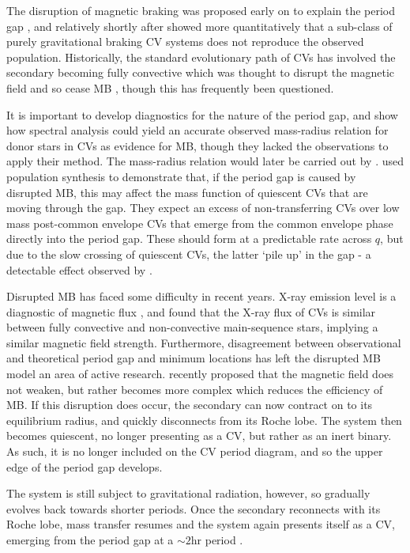 The disruption of magnetic braking was proposed early on to explain the period gap \citep{rappaport1983, spruit1983}, and relatively shortly after \citet{kolb1993} showed more quantitatively that a sub-class of purely gravitational braking CV systems does not reproduce the observed population. Historically, the standard evolutionary path of CVs has involved the secondary becoming fully convective which was thought to disrupt the magnetic field and so cease MB \citep{knigge11}, though this has frequently been questioned. 

It is important to develop diagnostics for the nature of the period gap, and \citet{smith1998} show how spectral analysis could yield an accurate observed mass-radius relation for donor stars in CVs as evidence for MB, though they lacked the observations to apply their method. The mass-radius relation would later be carried out by \citet{knigge11}.
\citet{Davis2008} used population synthesis to demonstrate that, if the period gap is caused by disrupted MB, this may affect the mass function of quiescent CVs that are moving through the gap. They expect an excess of non-transferring CVs over low mass post-common envelope CVs that emerge from the common envelope phase directly into the period gap. These should form at a predictable rate across $q$, but due to the slow crossing of quiescent CVs, the latter `pile up' in the gap - a detectable effect observed by \citet{zorotovic2011}.

Disrupted MB has faced some difficulty in recent years. X-ray emission level is a diagnostic of magnetic flux \citep{pevtsov2003}, and \citet{wright2016} found that the X-ray flux of CVs is similar between fully convective and non-convective main-sequence stars, implying a similar magnetic field strength. Furthermore, disagreement between observational and theoretical period gap and minimum locations \citep{knigge11} has left the disrupted MB model an area of active research. 
\citet{garraffo2018} recently proposed that the magnetic field does not weaken, but rather becomes more complex which reduces the efficiency of MB. If this disruption does occur, the secondary can now contract on to its equilibrium radius, and quickly disconnects from its Roche lobe. The system then becomes quiescent, no longer presenting as a CV, but rather as an inert binary. As such, it is no longer included on the CV period diagram, and so the upper edge of the period gap develops.

The system is still subject to gravitational radiation, however, so gradually evolves back towards shorter periods. Once the secondary reconnects with its Roche lobe, mass transfer resumes and the system again presents itself as a CV, emerging from the period gap at a $\sim2$hr period \citep{kolb2002}.

